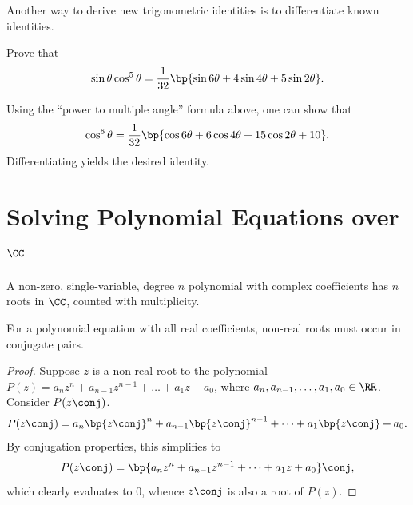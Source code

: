 Another way to derive new trigonometric identities is to differentiate known identities.

\begin{sample}
    Prove that \[\sin \t \cos^5 \t = \frac1{32} \bp{\sin 6\t + 4\sin 4\t + 5\sin 2\t}.\]
\end{sample}
\begin{sampans}
    Using the ``power to multiple angle'' formula above, one can show that \[\cos^6 \t = \frac1{32} \bp{\cos 6\t + 6\cos4\t + 15\cos2\t + 10}.\] Differentiating yields the desired identity.
\end{sampans}

\section{Solving Polynomial Equations over \texorpdfstring{$\CC$}{Complex Numbers}}

\begin{theorem}
    A non-zero, single-variable, degree $n$ polynomial with complex coefficients has $n$ roots in $\CC$, counted with multiplicity.
\end{theorem}

\begin{theorem}
    For a polynomial equation with all real coefficients, non-real roots must occur in conjugate pairs.
\end{theorem}
\begin{proof}
    Suppose $z$ is a non-real root to the polynomial $P(z) = a_n z^n + a_{n-1} z^{n-1} + \dots + a_1 z + a_0$, where $a_n, a_{n-1}, \dots, a_1, a_0 \in \RR$. Consider $P(z\conj)$. \[P(z\conj) = a_n \bp{z\conj}^n + a_{n-1} \bp{z\conj}^{n-1} + \dots + a_1 \bp{z\conj} + a_0.\] By conjugation properties, this simplifies to \[P(z\conj) = \bp{a_n z^n + a_{n-1} z^{n-1} + \dots + a_1 z + a_0}\conj,\] which clearly evaluates to 0, whence $z\conj$ is also a root of $P(z)$.
\end{proof}